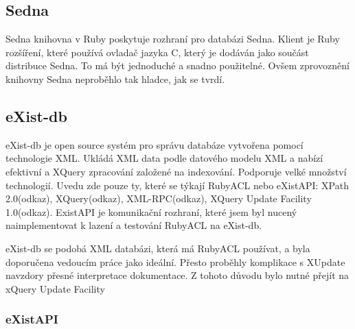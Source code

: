 \subsection{Sedna}
Sedna knihovna v Ruby poskytuje rozhraní pro databázi Sedna. Klient je Ruby rozšíření, které používá ovladač jazyka C, který je dodáván jako součást distribuce Sedna. To má být jednoduché a snadno použitelné. Ovšem zprovoznění knihovny Sedna neproběhlo tak hladce, jak se tvrdí.

\subsection{eXist-db}
eXist-db je open source systém pro správu databáze vytvořena pomocí technologie XML. Ukládá XML data podle datového modelu XML a nabízí efektivní a XQuery zpracování založené na indexování. Podporuje velké množství technologií. Uvedu zde pouze ty, které se týkají RubyACL nebo eXistAPI: XPath 2.0(odkaz), XQuery(odkaz), XML-RPC(odkaz), XQuery Update Facility 1.0(odkaz). ExistAPI je komunikační rozhraní, které jsem byl nucený naimplementovat k lazení a testování RubyACL na eXist-db.

eXist-db se podobá XML databázi, která má RubyACL používat, a byla doporučena vedoucím práce jako ideální. Přesto proběhly komplikace s XUpdate navzdory přesné interpretace dokumentace. Z tohoto důvodu bylo nutné přejít na xQuery Update Facility


\subsubsection{eXistAPI}

